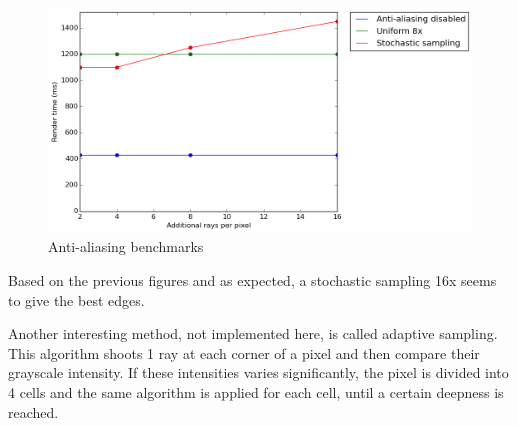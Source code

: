 \begin{figure}[H]
\centering
\includegraphics[width=0.65\linewidth]{img/antialiasing/benchmarksAA.png}
\caption{Anti-aliasing benchmarks}
\end{figure}


Based on the previous figures and as expected, a stochastic sampling 16x seems to give the best edges.

Another interesting method, not implemented here, is called adaptive sampling. This algorithm shoots 1 ray at each corner of a pixel and then compare their grayscale intensity. If these intensities varies significantly, the pixel is divided into 4 cells and the same algorithm is applied for each cell, until a certain deepness is reached.

